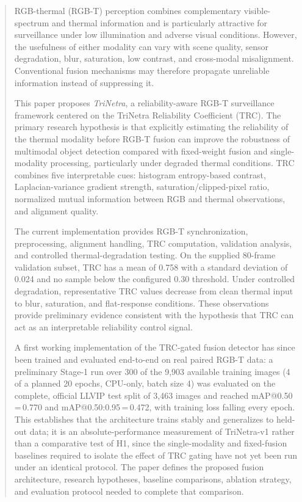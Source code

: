 \documentclass[conference]{IEEEtran}
\begin{document}
\begin{abstract}

RGB-thermal (RGB-T) perception combines complementary visible-spectrum
and thermal information and is particularly attractive for surveillance
under low illumination and adverse visual conditions. However, the
usefulness of either modality can vary with scene quality, sensor
degradation, blur, saturation, low contrast, and cross-modal
misalignment. Conventional fusion mechanisms may therefore propagate
unreliable information instead of suppressing it.

This paper proposes \textit{TriNetra}, a reliability-aware RGB-T
surveillance framework centered on the TriNetra Reliability Coefficient
(TRC). The primary research hypothesis is that explicitly estimating
the reliability of the thermal modality before RGB-T fusion can improve
the robustness of multimodal object detection compared with fixed-weight
fusion and single-modality processing, particularly under degraded
thermal conditions. TRC combines five interpretable cues: histogram
entropy-based contrast, Laplacian-variance gradient strength,
saturation/clipped-pixel ratio, normalized mutual information between
RGB and thermal observations, and alignment quality.

The current implementation provides RGB-T synchronization,
preprocessing, alignment handling, TRC computation, validation
analysis, and controlled thermal-degradation testing. On the supplied
80-frame validation subset, TRC has a mean of 0.758 with a standard
deviation of 0.024 and no sample below the configured 0.30 threshold.
Under controlled degradation, representative TRC values decrease from
clean thermal input to blur, saturation, and flat-response conditions.
These observations provide preliminary evidence consistent with the
hypothesis that TRC can act as an interpretable reliability control
signal.

A first working implementation of the TRC-gated fusion detector has
since been trained and evaluated end-to-end on real paired RGB-T data:
a preliminary Stage-1 run over 300 of the 9{,}903 available training
images (4 of a planned 20 epochs, CPU-only, batch size 4) was
evaluated on the complete, official LLVIP test split of 3{,}463 images
and reached mAP@0.50\,=\,0.770 and mAP@0.50:0.95\,=\,0.472, with
training loss falling every epoch. This establishes that the
architecture trains stably and generalizes to held-out data; it is an
absolute-performance measurement of TriNetra-v1 rather than a
comparative test of H1, since the single-modality and fixed-fusion
baselines required to isolate the effect of TRC gating have not yet
been run under an identical protocol. The paper defines the proposed
fusion architecture, research hypotheses, baseline comparisons,
ablation strategy, and evaluation protocol needed to complete that
comparison.

\end{abstract}
\end{document}
